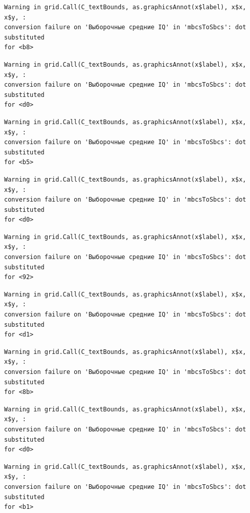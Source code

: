 \documentclass[
  letterpaper,
]{scrbook}
\theoremstyle{definition}
\theoremstyle{remark}
\begin{document}
\begin{verbatim}
Warning in grid.Call(C_textBounds, as.graphicsAnnot(x$label), x$x, x$y, :
conversion failure on 'Выборочные средние IQ' in 'mbcsToSbcs': dot substituted
for <b8>
\end{verbatim}

\begin{verbatim}
Warning in grid.Call(C_textBounds, as.graphicsAnnot(x$label), x$x, x$y, :
conversion failure on 'Выборочные средние IQ' in 'mbcsToSbcs': dot substituted
for <d0>
\end{verbatim}

\begin{verbatim}
Warning in grid.Call(C_textBounds, as.graphicsAnnot(x$label), x$x, x$y, :
conversion failure on 'Выборочные средние IQ' in 'mbcsToSbcs': dot substituted
for <b5>
\end{verbatim}

\begin{verbatim}
Warning in grid.Call(C_textBounds, as.graphicsAnnot(x$label), x$x, x$y, :
conversion failure on 'Выборочные средние IQ' in 'mbcsToSbcs': dot substituted
for <d0>
\end{verbatim}

\begin{verbatim}
Warning in grid.Call(C_textBounds, as.graphicsAnnot(x$label), x$x, x$y, :
conversion failure on 'Выборочные средние IQ' in 'mbcsToSbcs': dot substituted
for <92>
\end{verbatim}

\begin{verbatim}
Warning in grid.Call(C_textBounds, as.graphicsAnnot(x$label), x$x, x$y, :
conversion failure on 'Выборочные средние IQ' in 'mbcsToSbcs': dot substituted
for <d1>
\end{verbatim}

\begin{verbatim}
Warning in grid.Call(C_textBounds, as.graphicsAnnot(x$label), x$x, x$y, :
conversion failure on 'Выборочные средние IQ' in 'mbcsToSbcs': dot substituted
for <8b>
\end{verbatim}

\begin{verbatim}
Warning in grid.Call(C_textBounds, as.graphicsAnnot(x$label), x$x, x$y, :
conversion failure on 'Выборочные средние IQ' in 'mbcsToSbcs': dot substituted
for <d0>
\end{verbatim}

\begin{verbatim}
Warning in grid.Call(C_textBounds, as.graphicsAnnot(x$label), x$x, x$y, :
conversion failure on 'Выборочные средние IQ' in 'mbcsToSbcs': dot substituted
for <b1>
\end{verbatim}
\end{document}
